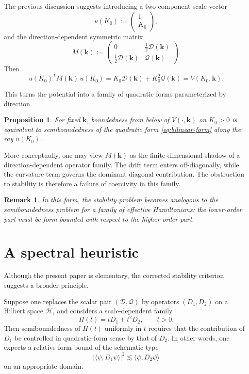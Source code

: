 \documentclass[11pt,a4paper]{article}
\newtheorem{proposition}[definition]{Proposition}
\newtheorem{remark}[definition]{Remark}
\newcommand{\kk}{\bm{k}}
\newcommand{\cD}{\mathcal{D}} %
\newcommand{\cQ}{\mathcal{Q}}
\begin{document}
	The previous discussion suggests introducing a two-component scale vector
	\[
	u(K_0):=
	\begin{pmatrix}
		1\\
		K_0
	\end{pmatrix},
	\]
	and the direction-dependent symmetric matrix
	\begin{equation}\label{eq:direction-matrix}
		M(\kk):=
		\begin{pmatrix}
			0 & \frac12 \cD(\kk)\\[0.3em]
			\frac12 \cD(\kk) & \cQ(\kk)
		\end{pmatrix}.
	\end{equation}
	Then
	\begin{equation}\label{eq:bilinear-form}
		u(K_0)^{\!T} M(\kk)\,u(K_0)=K_0\cD(\kk)+K_0^2\cQ(\kk)=V(K_0,\kk).
	\end{equation}
	
	This turns the potential into a family of quadratic forms parameterized by direction.
	
	\begin{proposition}
		For fixed \(\kk\), boundedness from below of \(V(\cdot,\kk)\) on \(K_0>0\) is equivalent to semiboundedness of the quadratic form \eqref{eq:bilinear-form} along the ray \(u(K_0)\).
	\end{proposition}
	
	More conceptually, one may view \(M(\kk)\) as the finite-dimensional shadow of a direction-dependent operator family. The drift term enters off-diagonally, while the curvature term governs the dominant diagonal contribution. The obstruction to stability is therefore a failure of coercivity in this family.
	
	\begin{remark}
		In this form, the stability problem becomes analogous to the semiboundedness problem for a family of effective Hamiltonians: the lower-order part must be form-bounded with respect to the higher-order part.
	\end{remark}
	
	\section{A spectral heuristic}
	
	Although the present paper is elementary, the corrected stability criterion suggests a broader principle.
	
	Suppose one replaces the scalar pair \((\cD,\cQ)\) by operators \((D_1,D_2)\) on a Hilbert space \(\mathcal{H}\), and considers a scale-dependent family
	\[
	H(t)=tD_1+t^2D_2,\qquad t>0.
	\]
	Then semiboundedness of \(H(t)\) uniformly in \(t\) requires that the contribution of \(D_1\) be controlled in quadratic-form sense by that of \(D_2\). In other words, one expects a relative form bound of the schematic type
	\[
	|\langle \psi,D_1\psi\rangle|^2
	\lesssim
	\langle \psi,D_2\psi\rangle
	\]
	on an appropriate domain.
	
\end{document}
